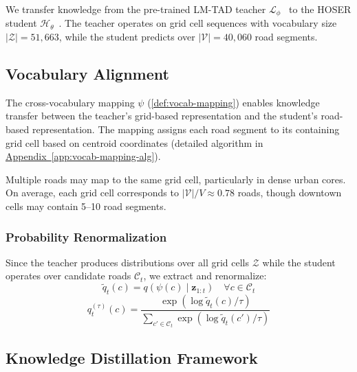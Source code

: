 We transfer knowledge from the pre-trained LM-TAD teacher $\mathcal{L}_\phi$~\cite{mbuyaTrajectoryAnomalyDetection2024} to the HOSER student $\mathcal{H}_\theta$~\cite{caoHolisticSemanticRepresentation2025}. The teacher operates on grid cell sequences with vocabulary size $|\mathcal{Z}| = 51{,}663$, while the student predicts over $|\mathcal{V}| = 40{,}060$ road segments.



\subsection{Vocabulary Alignment}
\label{sec:method-vocab}

The cross-vocabulary mapping $\psi$ (\autoref{def:vocab-mapping}) enables knowledge transfer between the teacher's grid-based representation and the student's road-based representation. The mapping assigns each road segment to its containing grid cell based on centroid coordinates (detailed algorithm in \hyperref[app:vocab-mapping-alg]{Appendix~\ref*{app:vocab-mapping-alg}}).

\begin{remark}
    Multiple roads may map to the same grid cell, particularly in dense urban cores. On average, each grid cell corresponds to $|\mathcal{V}|/V \approx 0.78$ roads, though downtown cells may contain 5--10 road segments.
\end{remark}

\subsubsection{Probability Renormalization}
\label{sec:method-renorm}

Since the teacher produces distributions over all grid cells $\mathcal{Z}$ while the student operates over candidate roads $\mathcal{C}_t$, we extract and renormalize:
\begin{equation}
    \tilde{q}_t(c) = q(\psi(c) \mid \mathbf{z}_{1:t}) \quad \forall c \in \mathcal{C}_t
    \label{eq:extract}
\end{equation}
\begin{equation}
    q_t^{(\tau)}(c) = \frac{\exp(\log \tilde{q}_t(c) / \tau)}{\sum_{c' \in \mathcal{C}_t} \exp(\log \tilde{q}_t(c') / \tau)}
    \label{eq:renorm}
\end{equation}

\subsection{Knowledge Distillation Framework}
\label{sec:method-kl}

